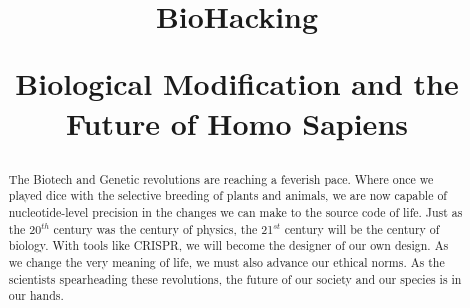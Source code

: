 \documentclass{article}
\title{BioHacking \\
\begin{large} 
    Biological Modification and the Future of Homo Sapiens
\end{large} }	%
\begin{document}
\maketitlepage
\newpage


\begin{abstract}
    The Biotech and Genetic revolutions are reaching a feverish pace.
    Where once we played dice with the selective breeding of plants and animals, we are now capable of nucleotide-level precision in the changes we can make to the source code of life.
    Just as the 20$^{th}$ century was the century of physics, the 21$^{st}$ century will be the century of biology.
    With tools like CRISPR, we will become the designer of our own design.
    As we change the very meaning of life, we must also advance our ethical norms.
    As the scientists spearheading these revolutions, the future of our society and our species is in our hands.
\end{abstract}
\newpage

\makeheader	%
\maketitle	%






\newpage
\makeworkscited
\end{document}
